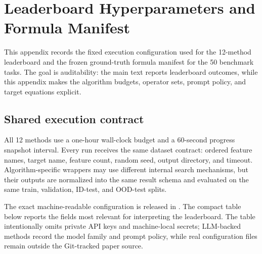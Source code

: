 \section{Leaderboard Hyperparameters and \core{} Formula Manifest}
\label{app:leaderboard-config-manifest}

This appendix records the fixed execution configuration used for the 12-method \core{} leaderboard and the frozen ground-truth formula manifest for the 50 benchmark tasks. The goal is auditability: the main text reports leaderboard outcomes, while this appendix makes the algorithm budgets, operator sets, prompt policy, and target equations explicit.

\subsection{Shared execution contract}

All 12 methods use a one-hour wall-clock budget and a 60-second progress snapshot interval. Every run receives the same dataset contract: ordered feature names, target name, feature count, random seed, output directory, and timeout. Algorithm-specific wrappers may use different internal search mechanisms, but their outputs are normalized into the same result schema and evaluated on the same train, validation, ID-test, and OOD-test splits.

The exact machine-readable configuration is released in . The compact table below reports the fields most relevant for interpreting the leaderboard. The table intentionally omits private API keys and machine-local secrets; LLM-backed methods record the model family and prompt policy, while real configuration files remain outside the Git-tracked paper source.


